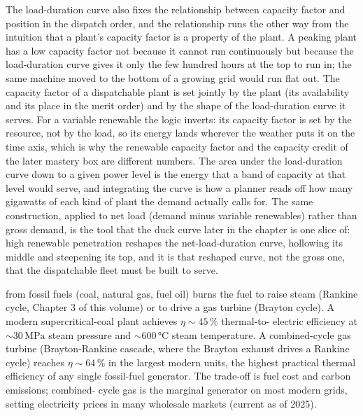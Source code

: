 

The load-duration curve also fixes the relationship between capacity factor
and position in the dispatch order, and the relationship runs the other
way from the intuition that a plant's capacity factor is a property of the
plant. A peaking plant has a low capacity factor not because it cannot run
continuously but because the load-duration curve gives it only the few
hundred hours at the top to run in; the same machine moved to the bottom of
a growing grid would run flat out. The capacity factor of a dispatchable
plant is set jointly by the plant (its availability and its place in the
merit order) and by the shape of the load-duration curve it serves. For a
variable renewable the logic inverts: its capacity factor is set by the
resource, not by the load, so its energy lands wherever the weather puts it
on the time axis, which is why the renewable capacity factor and the
capacity credit of the later mastery box are different numbers. The area
under the load-duration curve down to a given power level is the energy
that a band of capacity at that level would serve, and integrating the
curve is how a planner reads off how many gigawatts of each kind of plant
the demand actually calls for. The same construction, applied to net load
(demand minus variable renewables) rather than gross demand, is the tool
that the duck curve later in the chapter is one slice of: high renewable
penetration reshapes the net-load-duration curve, hollowing its middle and
steepening its top, and it is that reshaped curve, not the gross one, that
the dispatchable fleet must be built to serve.

 from fossil fuels (coal, natural gas,
fuel oil) burns the fuel to raise steam (Rankine cycle, Chapter 3 of
this volume) or to drive a gas turbine (Brayton cycle). A modern
supercritical-coal plant achieves $\eta\sim 45\,\%$ thermal-to-
electric efficiency at $\sim 30\,\si{\mega\pascal}$ steam pressure
and $\sim 600\,\si{\celsius}$ steam temperature. A combined-cycle gas
turbine (Brayton-Rankine cascade, where the Brayton exhaust drives a
Rankine cycle) reaches $\eta\sim 64\,\%$ in the largest modern units,
the highest practical thermal efficiency of any single fossil-fuel
generator. The trade-off is fuel cost and carbon emissions; combined-
cycle gas is the marginal generator on most modern grids, setting
electricity prices in many wholesale markets (current as of 2025).


